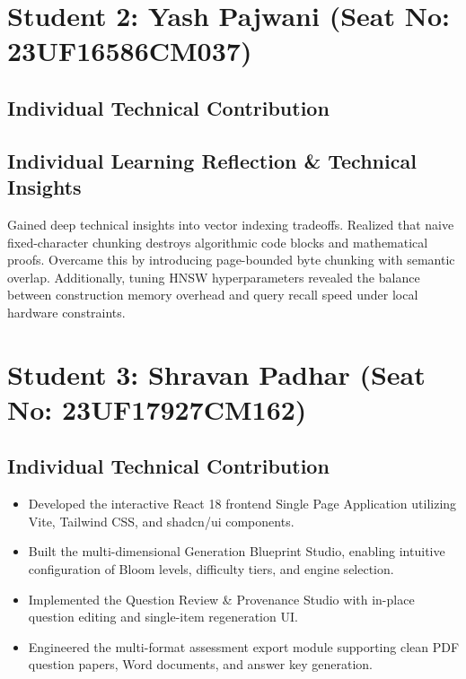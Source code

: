 \documentclass[12pt,a4paper]{report}
\begin{document}
\section{Student 2: Yash Pajwani (Seat No: 23UF16586CM037)}

\subsection{Individual Technical Contribution}

\subsection{Individual Learning Reflection \& Technical Insights}
Gained deep technical insights into vector indexing tradeoffs. Realized that naive fixed-character chunking destroys algorithmic code blocks and mathematical proofs. Overcame this by introducing page-bounded byte chunking with semantic overlap. Additionally, tuning HNSW hyperparameters revealed the balance between construction memory overhead and query recall speed under local hardware constraints.

\section{Student 3: Shravan Padhar (Seat No: 23UF17927CM162)}

\subsection{Individual Technical Contribution}
\begin{itemize}
    \item Developed the interactive React 18 frontend Single Page Application utilizing Vite, Tailwind CSS, and shadcn/ui components.
    \item Built the multi-dimensional Generation Blueprint Studio, enabling intuitive configuration of Bloom levels, difficulty tiers, and engine selection.
    \item Implemented the Question Review \& Provenance Studio with in-place question editing and single-item regeneration UI.
    \item Engineered the multi-format assessment export module supporting clean PDF question papers, Word documents, and answer key generation.
\end{itemize}
\end{document}
